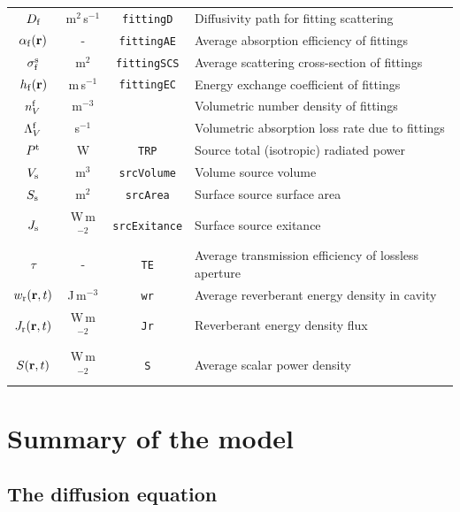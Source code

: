 \documentclass[a4paper]{article}
\numberwithin{equation}{section}
\begin{document}
\begin{center}
\begin{supertabular}{|c|c|c|l|}
$D_{\mathrm{f}}$             &m$^2$\,s$^{-1}$ &\texttt{fittingD}    &Diffusivity path for fitting scattering \\
$\alpha_{\mathrm{f}}(\boldsymbol{\mathrm{r}})$     &-               &\texttt{fittingAE}   &Average absorption efficiency of fittings \\
$\sigma_{\mathrm{f}}^{\mathrm{s}}$    &m$^2$           &\texttt{fittingSCS}  &Average scattering cross-section of fittings \\
$h_{\mathrm{f}}(\boldsymbol{\mathrm{r}})$          &m\,s$^{-1}$     &\texttt{fittingEC}   &Energy exchange coefficient of fittings \\
$n_V^{\mathrm{f}}$           &m$^{-3}$        &~                    &Volumetric number density of fittings \\
$\Lambda_V^{\mathrm{f}}$     &s$^{-1}$        &~                    &Volumetric absorption loss rate due to fittings \\
$P^{\mathrm{t}}$             &W               &\texttt{TRP}         &Source total (isotropic) radiated power \\
$V_{\mathrm{s}}$             &m$^3$           &\texttt{srcVolume}   &Volume source volume \\
$S_{\mathrm{s}}$             &m$^2$           &\texttt{srcArea}     &Surface source surface area \\
$J_{\mathrm{s}}$             &W\,m$^{-2}$     &\texttt{srcExitance} &Surface source exitance \\
$\tau$              &-               &\texttt{TE}          &Average transmission efficiency of lossless aperture \\
$w_{\mathrm{r}}(\boldsymbol{\mathrm{r}},t)$         &J\,m$^{-3}$     &\texttt{wr}          &Average reverberant energy density in cavity \\
$J_{\mathrm{r}}(\boldsymbol{\mathrm{r}},t)$         &W\,m$^{-2}$     &\texttt{Jr}          &Reverberant energy density flux \\
$S(\boldsymbol{\mathrm{r}},t)$             &W\,m$^{-2}$     &\texttt{S}           &Average scalar power density \\
\hline
\end{supertabular}
\end{center}

\section[Summary of the model]{Summary of the model}
\label{sc:sum}

\subsection[The diffusion equation]{The diffusion equation}
\label{sc:sum:edm}
\end{document}
